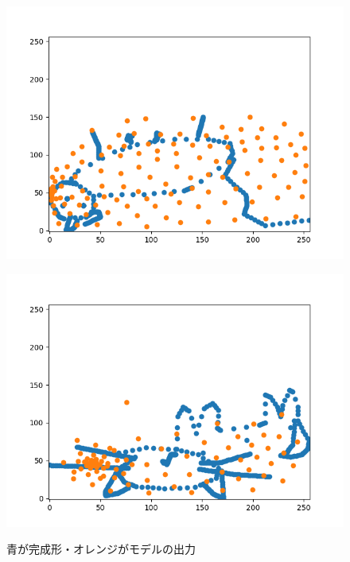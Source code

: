 \begin{figure}[h]
  \begin{minipage}[b]{0.45\linewidth}
    \centering
    \includegraphics[keepaspectratio, scale=0.45]{draw-forecast/fig/pointnet_output1.png}
    \label{fig:pointnet_output}
  \end{minipage}
  \begin{minipage}[b]{0.45\linewidth}
    \centering
    \includegraphics[keepaspectratio, scale=0.45]{draw-forecast/fig/pointnet_output2.png}
    \label{fig:pointnet_output_perplexity}
  \end{minipage}
  \caption{青が完成形・オレンジがモデルの出力}
\end{figure}

